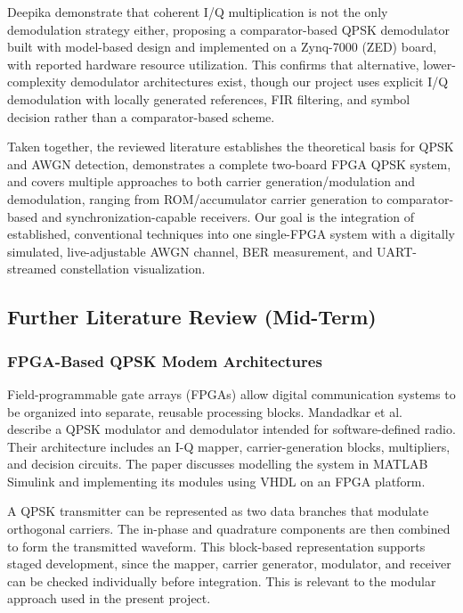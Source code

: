 \documentclass[10pt,twocolumn,letterpaper]{article}
\newcommand{\newstart}{\begingroup\color{blue}}
\begin{document}
Deepika \etal\cite{9019948} demonstrate that coherent I/Q multiplication is
not the only demodulation strategy either, proposing a comparator-based
QPSK demodulator built with model-based design and implemented on a
Zynq-7000 (ZED) board, with reported hardware resource utilization.
This confirms that alternative, lower-complexity demodulator
architectures exist, though our project uses explicit I/Q
demodulation with locally generated references, FIR filtering, and
symbol decision rather than a comparator-based scheme.

Taken together, the reviewed literature establishes the theoretical
basis for QPSK and AWGN detection, demonstrates a complete two-board
FPGA QPSK system, and covers multiple approaches to both carrier
generation/modulation and demodulation, ranging from ROM/accumulator
carrier generation to comparator-based and synchronization-capable
receivers. Our goal is the integration of established, conventional
techniques into one single-FPGA system with a digitally
simulated, live-adjustable AWGN channel, BER measurement, and
UART-streamed constellation visualization.

\newstart
\subsection{Further Literature Review (Mid-Term)}

\subsubsection{FPGA-Based QPSK Modem Architectures}
Field-programmable gate arrays (FPGAs) allow digital communication systems to be organized into separate, reusable processing blocks. Mandadkar et al.~\cite{mandadkar2014qpsk} describe a QPSK modulator and demodulator intended for software-defined radio. Their architecture includes an I-Q mapper, carrier-generation blocks, multipliers, and decision circuits. The paper discusses modelling the system in MATLAB Simulink and implementing its modules using VHDL on an FPGA platform.

A QPSK transmitter can be represented as two data branches that modulate orthogonal carriers. The in-phase and quadrature components are then combined to form the transmitted waveform. This block-based representation supports staged development, since the mapper, carrier generator, modulator, and receiver can be checked individually before integration. This is relevant to the modular approach used in the present project.
\end{document}
